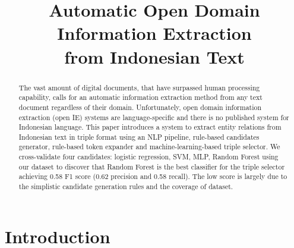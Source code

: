 \documentclass[conference,compsoc,12pt]{IEEEtran}
\begin{document}
\title{Automatic Open Domain Information Extraction\\from Indonesian Text}


\author{
	\and
}


\maketitle

\begin{abstract}

The vast amount of digital documents, that have surpassed human processing capability, calls for an automatic information extraction method from any text document regardless of their domain. Unfortunately, open domain information extraction (open IE) systems are language-specific and there is no published system for Indonesian language. This paper introduces a system to extract entity relations from Indonesian text in triple format using an NLP pipeline, rule-based candidates generator, rule-based token expander and machine-learning-based triple selector. We cross-validate four candidates: logistic regression, SVM, MLP, Random Forest using our dataset to discover that Random Forest is the best classifier for the triple selector achieving 0.58 F1 score (0.62 precision and 0.58 recall). The low score is largely due to the simplistic candidate generation rules and the coverage of dataset.

\end{abstract}

\IEEEpeerreviewmaketitle

\section{Introduction}
\end{document}
